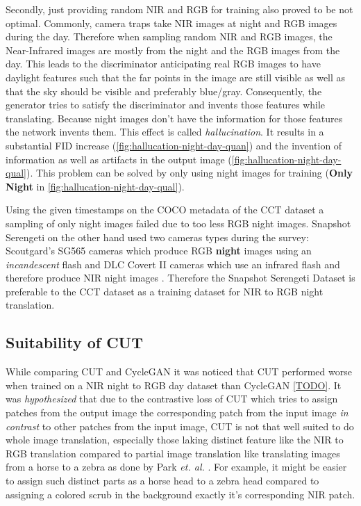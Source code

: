 \documentclass[a4paper,11pt, DIV=12]{scrartcl}
\begin{document}
Secondly, just providing random NIR and RGB for training also proved to be not optimal.
Commonly, camera traps take NIR images at night and RGB images during the day.
Therefore when sampling random NIR and RGB images, the Near-Infrared images are mostly from the night and the RGB images from the day.
This leads to the discriminator anticipating real RGB images to have daylight features such that the far points in the image are still visible as well as that the sky should be visible and preferably blue/gray.
Consequently, the generator tries to satisfy the discriminator and invents those features while translating.
Because night images don't have the information for those features the network invents them.
This effect is called \textit{hallucination}. It results in a substantial FID increase (\autoref{fig:hallucation-night-day-quan}) and the invention of information as
well as artifacts in the output image (\autoref{fig:hallucation-night-day-qual}).
This problem can be solved by only using night images for training (\textbf{Only Night} in \autoref{fig:hallucation-night-day-qual}).

Using the given timestamps on the COCO metadata of the CCT dataset \cite{caltech} a sampling of only night images failed due to too less RGB night images.
Snapshot Serengeti on the other hand used two cameras types during the survey:
Scoutgard's SG565 cameras which produce RGB \textbf{night} images using an \textit{incandescent} flash and
DLC Covert II cameras which use an infrared flash and therefore produce NIR night images \cite{serengeti}.
Therefore the Snapshot Serengeti Dataset is preferable to the CCT dataset as a training dataset for NIR to RGB night translation.

\subsection{Suitability of CUT}
While comparing CUT and CycleGAN it was noticed that CUT performed worse when trained on a NIR night to RGB day dataset than CycleGAN \autoref{TODO}.
It was \textit{hypothesized} that due to the contrastive loss of CUT which tries to assign patches from the output image the corresponding patch from the input image
\textit{in contrast} to other patches from the input image, CUT is not that well suited to do whole image translation, especially those laking distinct feature like
the NIR to RGB translation compared to partial image translation like translating images from a horse to a zebra as done by Park \textit{et. al.} \cite{cut}.
For example, it might be easier to assign such distinct parts as a horse head to a zebra head compared to assigning a colored scrub in the background exactly it's
corresponding NIR patch.
\end{document}
